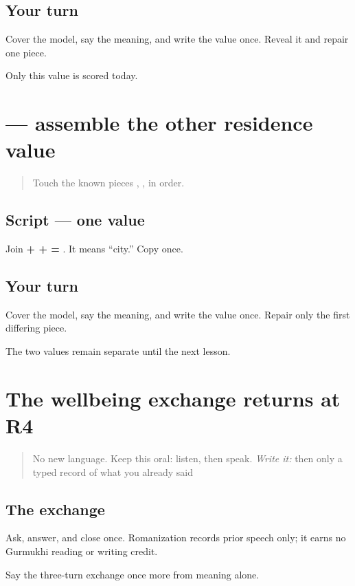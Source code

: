 \subsection*{Your turn}
Cover the model, say the meaning, and write the value once. Reveal it and repair one piece.

\begin{tcolorbox}[breakable,colback=teal!4,colframe=teal!35!black,title={Before you move on}]
Only this value is scored today.
\end{tcolorbox}
\section[\texorpdfstring{\pa{ਸ਼ਹਿਰ} (shahir)}{ਸ਼ਹਿਰ (shahir)}]{ — assemble the other residence value}

\label{lesson:PA-W04-city}



\begin{quote}
Touch the known pieces \textbf{}, \textbf{}, \textbf{} in order.
\end{quote}

\subsection*{Script — one value}
Join \textbf{ +  +  = }. It means “city.” Copy \textbf{} once.

\subsection*{Your turn}
Cover the model, say the meaning, and write the value once. Repair only the first differing piece.

\begin{tcolorbox}[breakable,colback=teal!4,colframe=teal!35!black,title={Before you move on}]
The two values remain separate until the next lesson.
\end{tcolorbox}
\section[Practice]{The wellbeing exchange returns at R4}

\label{lesson:PA-R18-wellbeing-r4}



\begin{quote}
No new language. Keep this oral: listen, then speak. \emph{Write it:} then only a typed record of what you already said
\end{quote}

\subsection*{The exchange}
Ask, answer, and close once. Romanization records prior speech only; it earns no Gurmukhi reading or writing credit.

\begin{tcolorbox}[breakable,colback=teal!4,colframe=teal!35!black,title={Before you move on}]
Say the three-turn exchange once more from meaning alone.
\end{tcolorbox}
